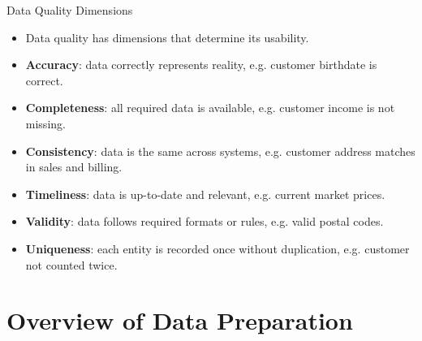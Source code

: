 \documentclass[aspectratio=169, table]{beamer}
\begin{document}
\begin{frame}{Data Quality Dimensions}
	\vspace{20pt}
	
	\begin{itemize}
		\item Data quality has dimensions that determine its usability.
		
		\item \textbf{Accuracy}: data correctly represents reality, e.g. customer birthdate is correct.
		
		\item \textbf{Completeness}: all required data is available, e.g. customer income is not missing.
		
		\item \textbf{Consistency}: data is the same across systems, e.g. customer address matches in sales and billing.
		
		\item \textbf{Timeliness}: data is up-to-date and relevant, e.g. current market prices.
		
		\item \textbf{Validity}: data follows required formats or rules, e.g. valid postal codes.
		
		\item \textbf{Uniqueness}: each entity is recorded once without duplication, e.g. customer not counted twice.
	\end{itemize}
	
\end{frame}

\section{Overview of Data Preparation}
\end{document}
